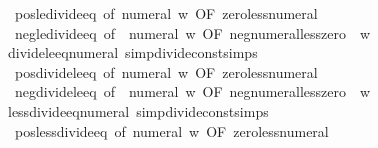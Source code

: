 \begin{isabellebody}
\ \ pos{\isacharunderscore}{\kern0pt}le{\isacharunderscore}{\kern0pt}divide{\isacharunderscore}{\kern0pt}eq\ {\isacharbrackleft}{\kern0pt}of\ {\isachardoublequoteopen}numeral\ w{\isachardoublequoteclose}{\isacharcomma}{\kern0pt}\ OF\ zero{\isacharunderscore}{\kern0pt}less{\isacharunderscore}{\kern0pt}numeral{\isacharbrackright}{\kern0pt}\isanewline
\ \ neg{\isacharunderscore}{\kern0pt}le{\isacharunderscore}{\kern0pt}divide{\isacharunderscore}{\kern0pt}eq\ {\isacharbrackleft}{\kern0pt}of\ {\isachardoublequoteopen}{\isacharminus}{\kern0pt}\ numeral\ w{\isachardoublequoteclose}{\isacharcomma}{\kern0pt}\ OF\ neg{\isacharunderscore}{\kern0pt}numeral{\isacharunderscore}{\kern0pt}less{\isacharunderscore}{\kern0pt}zero{\isacharbrackright}{\kern0pt}\ \ w\isanewline
\isanewline
{}\isamarkupfalse%
\ divide{\isacharunderscore}{\kern0pt}le{\isacharunderscore}{\kern0pt}eq{\isacharunderscore}{\kern0pt}numeral{}\ {\isacharbrackleft}{\kern0pt}simp{\isacharcomma}{\kern0pt}divide{\isacharunderscore}{\kern0pt}const{\isacharunderscore}{\kern0pt}simps{\isacharbrackright}{\kern0pt}\ {\isacharequal}{\kern0pt}\isanewline
\ \ pos{\isacharunderscore}{\kern0pt}divide{\isacharunderscore}{\kern0pt}le{\isacharunderscore}{\kern0pt}eq\ {\isacharbrackleft}{\kern0pt}of\ {\isachardoublequoteopen}numeral\ w{\isachardoublequoteclose}{\isacharcomma}{\kern0pt}\ OF\ zero{\isacharunderscore}{\kern0pt}less{\isacharunderscore}{\kern0pt}numeral{\isacharbrackright}{\kern0pt}\isanewline
\ \ neg{\isacharunderscore}{\kern0pt}divide{\isacharunderscore}{\kern0pt}le{\isacharunderscore}{\kern0pt}eq\ {\isacharbrackleft}{\kern0pt}of\ {\isachardoublequoteopen}{\isacharminus}{\kern0pt}\ numeral\ w{\isachardoublequoteclose}{\isacharcomma}{\kern0pt}\ OF\ neg{\isacharunderscore}{\kern0pt}numeral{\isacharunderscore}{\kern0pt}less{\isacharunderscore}{\kern0pt}zero{\isacharbrackright}{\kern0pt}\ \ w\isanewline
\isanewline
{}\isamarkupfalse%
\ less{\isacharunderscore}{\kern0pt}divide{\isacharunderscore}{\kern0pt}eq{\isacharunderscore}{\kern0pt}numeral{}\ {\isacharbrackleft}{\kern0pt}simp{\isacharcomma}{\kern0pt}divide{\isacharunderscore}{\kern0pt}const{\isacharunderscore}{\kern0pt}simps{\isacharbrackright}{\kern0pt}\ {\isacharequal}{\kern0pt}\isanewline
\ \ pos{\isacharunderscore}{\kern0pt}less{\isacharunderscore}{\kern0pt}divide{\isacharunderscore}{\kern0pt}eq\ {\isacharbrackleft}{\kern0pt}of\ {\isachardoublequoteopen}numeral\ w{\isachardoublequoteclose}{\isacharcomma}{\kern0pt}\ OF\ zero{\isacharunderscore}{\kern0pt}less{\isacharunderscore}{\kern0pt}numeral{\isacharbrackright}{\kern0pt}\isanewline

\end{isabellebody}
